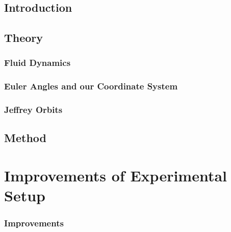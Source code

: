 \documentclass[]{report}
\begin{document}




\setcounter{page}{1}
\pagestyle{fancy}
\setspecialhdr
\tableofcontents


\newpage
\setdefaulthdr
{}	
\setcounter{page}{1}

\chapter{Introduction}



\chapter{Theory}


\section{Fluid Dynamics}


\section{Euler Angles and our Coordinate System}


\section{Jeffrey Orbits}


\chapter{Method}

\part{Improvements of Experimental Setup}

\section{Improvements}
\end{document}
